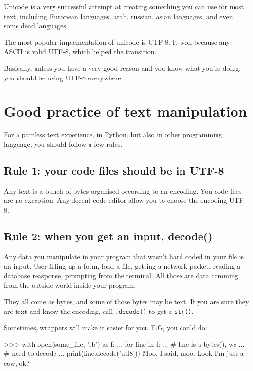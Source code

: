 Unicode is a very successful attempt at creating something you can use for most text, including European languages, arab, russian, asian languages, and even some dead languages.

The most popular implementation of unicode is UTF-8. It won because any ASCII is valid UTF-8, which helped the transition.

Basically, unless you have a very good reason and you know what you're doing, you should be using UTF-8 everywhere.

\section{Good practice of text manipulation}

For a painless text experience, in Python, but also in other programming language, you should follow a few rules.

\subsection{Rule 1: your code files should be in UTF-8}

Any text is a bunch of bytes organised occording to an encoding. You code files are no exception. Any decent code editor allow you to choose the encoding UTF-8.

\subsection{Rule 2: when you get an input, decode()}

Any data you manipulate in your program that wasn't hard coded in your file is an input. User filling up a form, load a file, getting a network packet, reading a database reasponse, prompting from the terminal. All those are data comming from the outside world inside your program.

They all come as bytes, and some of those bytes may be text. If you are sure they are text and know the encoding, call \lstinline{.decode()} to get a \lstinline{str()}.

Sometimes, wrappers will make it easier for you. E.G, you could do:

\begin{py3}
>>> with open(some_file, 'rb') as f:
...     for line in f:
...         # line is a bytes(), we
...         # need to decode
...         print(line.decode('utf8'))
Moo.
I said, moo.
Look I'm just a cow, ok?
\end{py3}


